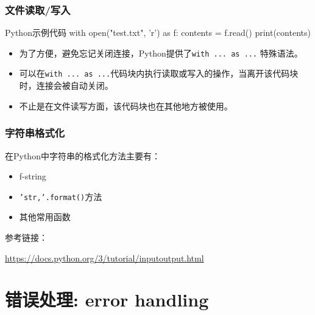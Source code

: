 \documentclass[9pt]{beamer}
\begin{document}
\begin{frame}[fragile]
\frametitle{文件读取/写入}
\begin{codebox}{Python}{示例代码}
with open("test.txt", 'r') as f:
    contents = f.read()
print(contents)
\end{codebox}

\begin{itemize}
    \item 为了方便，避免忘记关闭连接，Python提供了\texttt{with ... as ...} 特殊语法。
    \item 可以在\texttt{with ... as ...}代码块内执行读取或写入的操作，当离开该代码块时，连接会被自动关闭。
    \item 不止是在文件读写方面，该代码块也在其他地方被使用。
\end{itemize}

\end{frame}


\begin{frame}
    \frametitle{字符串格式化}

    在Python中字符串的格式化方法主要有：

    \begin{itemize}
        \item f-string
        \item \texttt{'str{},{}'.format()}方法
        \item 其他常用函数
    \end{itemize}

\vspace{5mm}

    参考链接：

    \url{https://docs.python.org/3/tutorial/inputoutput.html}

\end{frame}


\section{错误处理: error handling}
\end{document}
